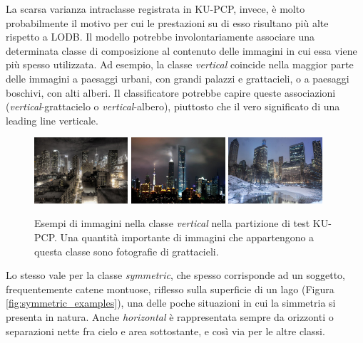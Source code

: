 La scarsa varianza intraclasse registrata in KU-PCP, invece, è molto probabilmente il motivo per cui le prestazioni su di esso risultano più alte rispetto a LODB. Il modello potrebbe involontariamente associare una determinata classe di composizione al contenuto delle immagini in cui essa viene più spesso utilizzata. Ad esempio, la classe \textit{vertical} coincide nella maggior parte delle immagini a paesaggi urbani, con grandi palazzi e grattacieli, o a paesaggi boschivi, con alti alberi. Il classificatore potrebbe capire queste associazioni (\textit{vertical}-grattacielo o \textit{vertical}-albero), piuttosto che il vero significato di una leading line verticale. 
\begin{figure}[t]
    \centering
    \includegraphics[width=0.31\textwidth]{Immagini/conclusioni/0002.jpg}
    \hspace{2mm}
    \includegraphics[width=0.31\textwidth]{Immagini/conclusioni/0035.jpg}
    \hspace{2mm}
    \includegraphics[width=0.31\textwidth]{Immagini/conclusioni/0167.jpg}
    \caption{Esempi di immagini nella classe \textit{vertical} nella partizione di test KU-PCP. Una quantità importante di immagini che appartengono a questa classe sono fotografie di grattacieli.}
    \label{fig:vertical_examples}
\end{figure}
Lo stesso vale per la classe \textit{symmetric}, che spesso corrisponde ad un soggetto, frequentemente catene montuose, riflesso sulla superficie di un lago (Figura \ref{fig:symmetric_examples}), una delle poche situazioni in cui la simmetria si presenta in natura. Anche \textit{horizontal} è rappresentata sempre da orizzonti o separazioni nette fra cielo e area sottostante, e così via per le altre classi.
